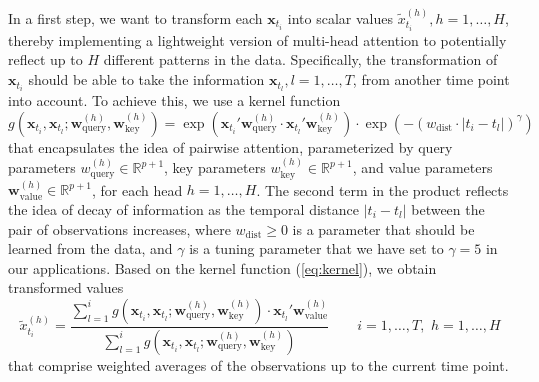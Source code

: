 \documentclass[AMA,Times1COL]{WileyNJDv5} %
\begin{document}
In a first step, we want to transform each $\mathbf{x}_{t_i}$ into scalar values $\tilde{x}^{(h)}_{t_i}, h=1,\ldots,H$, thereby implementing a lightweight version of multi-head attention to potentially reflect up to $H$ different patterns in the data. Specifically, the transformation of $\mathbf{x}_{t_i}$ should be able to take the information $\mathbf{x}_{t_l}, l=1,\ldots,T$, from another time point into account. To achieve this, we use a kernel function 
\begin{equation}\label{eq:kernel}
g(\mathbf{x}_{t_i}, \mathbf{x}_{t_l}; \mathbf{w}_{\text{query}}^{(h)}, \mathbf{w}_{\text{key}}^{(h)}) = \exp{\left(\mathbf{x}_{t_i}' \mathbf{w}_{\text{query}}^{(h)} \cdot \mathbf{x}_{t_l}' \mathbf{w}_{\text{key}}^{(h)}\right)} \cdot \exp{\left(-(w_{\mathrm{dist}}\cdot|t_i - t_l|)^\gamma\right)} 
\end{equation}
that encapsulates the idea of pairwise attention, parameterized by query parameters $w_{\mathrm{query}}^{(h)} \in \mathbb{R}^{p+1}$, key parameters $w_{\mathrm{key}}^{(h)} \in \mathbb{R}^{p + 1}$, and value parameters $\mathbf{w}_{\text{value}}^{(h)} \in \mathbb{R}^{p + 1}$, for each head $h=1,\ldots, H$. The second term in the product reflects the idea of decay of information as the temporal distance $|t_i - t_l|$ between the pair of observations increases, where $w_{\mathrm{dist}} \geq 0$ is a parameter that should be learned from the data, and $\gamma$ is a tuning parameter that we have set to $\gamma=5$ in our applications. 
Based on the kernel function (\ref{eq:kernel}), we obtain transformed values 
\begin{equation}
\label{eq:transform}
\tilde{x}_{t_i}^{(h)} = \frac{ \sum_{l=1}^i g(\mathbf{x}_{t_i}, \mathbf{x}_{t_l}; \mathbf{w}_{\mathrm{query}}^{(h)}, \mathbf{w}_{\mathrm{key}}^{(h)}) \cdot \mathbf{x}_{t_l}' \mathbf{w}_{\text{value}}^{(h)}}{\sum_{l=1}^i g(\mathbf{x}_{t_i}, \mathbf{x}_{t_l}; \mathbf{w}_{\mathrm{query}}^{(h)}, \mathbf{w}_{\mathrm{key}}^{(h)})} 
\qquad i=1,\ldots,T, \,\, h=1,\ldots,H
\end{equation}
that comprise weighted averages of the observations up to the current time point.
\end{document}
